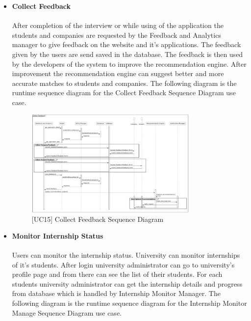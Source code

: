 \begin{itemize}
\begin{figure}[H]
    \caption{\label{fig:metamodel9}[UC14] Set Up Interview Sequence Diagram}
    \end{figure}
    \clearpage
    \item \textbf{Collect Feedback} \\ \\
    After completion of the interview or while using of the application the students and companies are requested by the Feedback and Analytics manager to give feedback on the website and it's applications. The feedback given by the users are send saved in the database. The feedback is then used by the developers of the system to improve the recommendation engine. After improvement the recommendation engine can suggest better and more accurate matches to students and companies. The following diagram is the runtime sequence diagram for the Collect Feedback Sequence Diagram use case.
    \begin{figure}[H]
    \centering
    \includegraphics[width=0.8\textwidth]{Images/Collect Feedback sequence diagram.png}
    \caption{\label{fig:metamodel9}[UC15] Collect Feedback Sequence Diagram}
    \end{figure}
    \clearpage
    \item \textbf{Monitor Internship Status} \\ \\
    Users can monitor the internship status. University can monitor internships of it's students. After login university administrator can go to university's profile page and from there can see the list of their students. For each students university administrator can get the internship details and progress from database which is handled by Internship Monitor Manager. The following diagram is the runtime sequence diagram for the Internship Monitor Manage Sequence Diagram use case.
    \begin{figure}[H]
    \centering

\end{figure}
\end{itemize}
